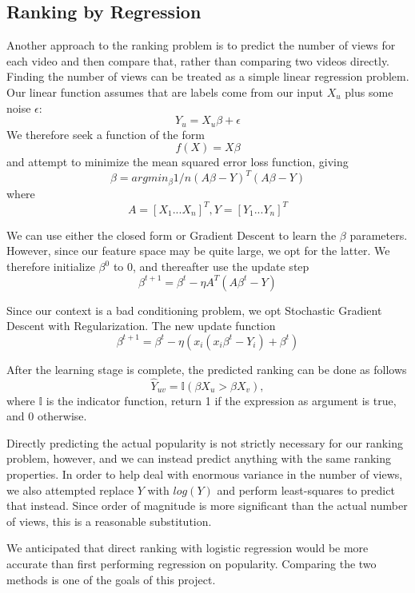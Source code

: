 \subsection{Ranking by Regression}
\label{sec:regression}
Another approach to the ranking problem is to predict the number of views for each video and then compare that, rather than comparing two videos directly. Finding the number of views can be treated as a simple linear regression problem. Our linear function assumes that are labels come from our input $X_u$ plus some noise $\epsilon$:
\begin{equation}
Y_u = X_u \beta + \epsilon
\end{equation}
We therefore seek a function of the form
\begin{equation}
f(X) = X \beta
\end{equation}
and attempt to minimize the mean squared error loss function, giving
\begin{equation}
\beta = arg min_\beta 1/n (A \beta - Y)^T(A \beta - Y)
\end{equation}
where
\begin{equation}
A = [X_1 ... X_n]^T, Y = [Y_1 ... Y_n]^T
\end{equation}
  
We can use either the closed form or Gradient Descent to learn the $\beta$ parameters.  However, since our feature space may be quite large, we opt for the latter.  We therefore initialize $\beta^0$ to 0, and thereafter use the update step
\begin{equation}
\beta^{t+1} = \beta^t - \eta A^T (A \beta^t - Y)
\end{equation}
 
Since our context is a bad conditioning problem, we opt Stochastic Gradient Descent with Regularization. The new update function
	\begin{equation}
		\beta^{t+1} = \beta^t - \eta (x_i (x_i\beta^t - Y_i) + \beta^t)
	\end{equation}

After the learning stage is complete, the predicted ranking can be done as follows
\begin{equation}
\hat{Y}_{uv} = \mathbb{I}(\beta X_u > \beta X_v),
\end{equation}
where $\mathbb{I}$ is the indicator function, return 1 if the expression as argument is true, and 0 otherwise.

Directly predicting the actual popularity is not strictly necessary for our ranking problem, however, and we can instead predict anything with the same ranking properties.  In order to help deal with enormous variance in the number of views, we also attempted replace $Y$ with $log(Y)$ and perform least-squares to predict that instead.  Since order of magnitude is more significant than the actual number of views, this is a reasonable substitution.

We anticipated that direct ranking with logistic regression would be more accurate than first performing regression on popularity.  Comparing the two methods is one of the goals of this project.

